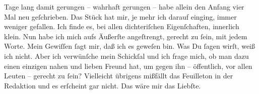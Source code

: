                Tage lang damit gerungen – wahrhaft gerungen – habe allein den Anfang vier Mal neu
               geſchrieben. Das Stück hat
               mir, je mehr ich darauf einging, immer weniger gefallen. Ich finde es, bei allen
               dichteriſchen Eigenſchaften, innerlich klein. Nun habe ich mich aufs Äußerſte
               angeſtrengt, {\pb}gerecht zu{ }ſein, mit jedem Worte. Mein
               Gewiſſen{ }ſagt mir, daß ich es geweſen bin. Was Du{ }ſagen wirſt, weiß ich nicht. Aber
               ich verwünſche mein Schickſal und ich frage mich, ob man dazu einen einzigen nahen
               und lieben Freund hat, um gegen ihn – öffentlich, vor allen Leuten – gerecht zu{ }ſein?
               Vielleicht übrigens mißfällt das Feuilleton in der Redaktion und es erſcheint {\pb}gar nicht. Das
               wäre mir das Liebſte.\pend
           
